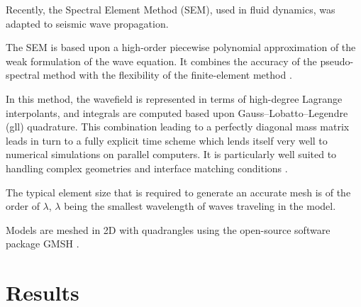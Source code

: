 \documentclass[manuscript,revised]{geophysics}
\begin{document}
\noindent Recently, the Spectral Element Method (SEM), used in fluid dynamics, was adapted to seismic wave propagation. 

\noindent The SEM is based upon a high-order piecewise polynomial approximation of the weak formulation of the wave equation. It combines the accuracy of the pseudo-spectral method with the flexibility of the finite-element method \citep{Tromp_SEM_2008}. 

\noindent In this method, the wavefield is represented in terms of high-degree Lagrange interpolants, and integrals are computed based upon Gauss–Lobatto–Legendre (gll) quadrature. This combination leading to a perfectly diagonal mass matrix leads in turn to a fully explicit time scheme which lends itself very well to numerical simulations on parallel computers. It is particularly well suited to handling complex geometries and interface matching conditions \citep{Cristini_SEM_2012}. 

\noindent The typical element size that is required to generate an accurate mesh is of the order of $\lambda$, $\lambda$ being the smallest wavelength of waves traveling in the model.

\noindent Models are meshed in 2D with quadrangles using the open-source software package GMSH \citep{Geuzaine_MSH_2009}. 



\section{Results}

\end{document}
